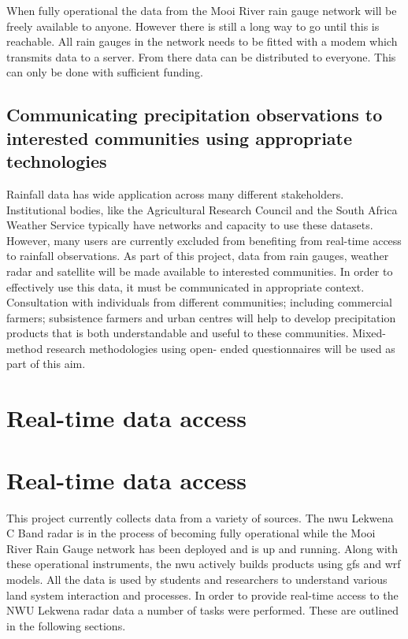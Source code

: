 \documentclass{wrcreport}
\begin{document}
When fully operational the data from the Mooi River rain gauge network
will be freely available to anyone. However there is still a long way
to go until this is reachable. All rain gauges in the network needs to
be fitted with a modem which transmits data to a server. From there
data can be distributed to everyone. This can only be done with
sufficient funding.

\section{Communicating precipitation observations to interested communities using appropriate technologies}

Rainfall data has wide application across many different stakeholders.
Institutional bodies, like the Agricultural Research Council and the
South Africa Weather Service typically have networks and capacity to
use these datasets. However, many users are currently excluded from
benefiting from real-time access to rainfall observations. As part of
this project, data from rain gauges, weather radar and satellite will
be made available to interested communities. In order to effectively
use this data, it must be communicated in appropriate context.
Consultation with individuals from different communities; including
commercial farmers; subsistence farmers and urban centres will help to
develop precipitation products that is both understandable and useful
to these communities. Mixed-method research methodologies using open-
ended questionnaires will be used as part of this aim.

\chapter{Real-time data access}
\label{chap:real-time}


\chapter{Real-time data access}
\label{chap:real-time}

This project currently collects data from a variety of sources. The
\gls{nwu} Lekwena C Band radar is in the process of becoming fully
operational while the Mooi River Rain Gauge network has been deployed
and is up and running. Along with these operational instruments, the
\gls{nwu} actively builds products using \gls{gfs} and \gls{wrf} models. All
the data is used by students and researchers to understand various
land system interaction and processes. In order to provide real-time
access to the NWU Lekwena radar data a number of tasks were performed.
These are outlined in the following sections.
\end{document}
